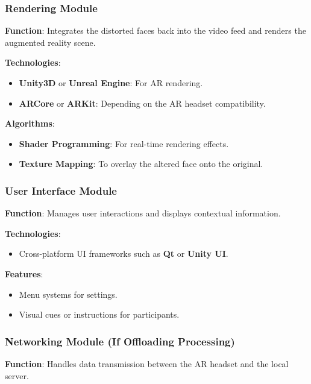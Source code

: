 \documentclass{article}
\begin{document}
\subsubsection{Rendering Module}

\textbf{Function}: Integrates the distorted faces back into the video feed and renders the augmented reality scene.

\textbf{Technologies}:
\begin{itemize}
    \item \textbf{Unity3D} or \textbf{Unreal Engine}: For AR rendering.
    \item \textbf{ARCore} or \textbf{ARKit}: Depending on the AR headset compatibility.
\end{itemize}

\textbf{Algorithms}:
\begin{itemize}
    \item \textbf{Shader Programming}: For real-time rendering effects.
    \item \textbf{Texture Mapping}: To overlay the altered face onto the original.
\end{itemize}

\subsubsection{User Interface Module}

\textbf{Function}: Manages user interactions and displays contextual information.

\textbf{Technologies}:
\begin{itemize}
    \item Cross-platform UI frameworks such as \textbf{Qt} or \textbf{Unity UI}.
\end{itemize}

\textbf{Features}:
\begin{itemize}
    \item Menu systems for settings.
    \item Visual cues or instructions for participants.
\end{itemize}

\subsubsection{Networking Module (If Offloading Processing)}

\textbf{Function}: Handles data transmission between the AR headset and the local server.
\end{document}
